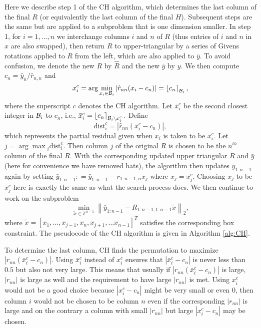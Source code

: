 \documentclass[conference]{IEEEtran}
\newcommand{\be}{\begin{equation}}
\newcommand{\ee}{\end{equation}}
\newcommand{\dist}{\mathrm{dist}}
\begin{document}
Here we describe  step 1 of the CH algorithm, which determines the last column of the final $R$ 
(or equivalently the last column of the final $H$).
Subsequent steps are the same but are applied to a subproblem that is one dimension smaller. 
In step 1, for $i = 1,\dots,n$ we interchange
columns $i$ and $n$ of  $R$ (thus entries of $i$ and $n$ in $x$ are also swapped), then return $R$ to upper-triangular
by a series of Givens rotations applied to $R$ from the left, which  are also applied to $\bar{y}$.
To avoid confusion, we denote the new $R$ by $\hat{R}$ and the new $\bar{y}$ by $\hat{y}$.
We then compute  $c_n=\hat{y}_n/\hat{r}_{n,n}$ and 
\be
x_i^c=\arg\min_{x_i\in {\cal B}_i}\left |\hat{r}_{nn}(x_i- c_n) \right | = \left \lfloor c_n \right \rceil_{{\cal B}_i},
\label{eq:xic}
\ee
where the superscript $c$ denotes the CH algorithm. 
Let $\bar{x}_i^c$ be the second closest integer in ${{\cal B}_i}$ to $c_n$,
i.e.,  
$\bar{x}_i^c= \left \lfloor c_n \right \rceil_{{\cal B}_i\backslash x_i^c}.$
Define
\be
\dist_i^c = |\hat{r}_{nn}( \bar{x}_i^c -c_n) |, 
\label{eq:dic}
\ee
which represents the partial residual given when $x_i$ is taken to be $\bar{x}_i^c$.
Let $j = {\arg\max}_i \dist_i^c$.
Then  column $j$ of the original $R$ is chosen to be the $n^{th}$ column of the final $R$.
With the corresponding updated upper triangular $R$ and $\bar{y}$
(here for convenience we have removed hats),
the algorithm then updates  $\bar{y}_{1:n-1}$ again
by setting $\bar{y}_{1:n-1}: = \bar{y}_{1:n-1} - r_{1:n-1,n}x_j$ where $x_j=x_j^c$. 
Choosing  $x_j$ to be  $x_j^c$ here is exactly the same as what the search process does.
We then continue to work on the subproblem 
\be
\min_{\tilde{x}\in \mathbb{Z}^{n-1}} \left \| \bar{y}_{1:n-1}-R_{1:n-1,1:n-1}\tilde{x} \right \|_2,
\label{eq:subc}
\ee
where $\tilde{x}=[x_1,\ldots, x_{j-1}, x_n, x_{j+1}, \ldots x_{n-1}]^T$ satisfies the corresponding box constraint.
The pseudocode of the CH algorithm is given in Algorithm \ref{alg:CH}.

To determine the last column, CH finds the permutation to 
maximize $\left |r_{nn}(\bar{x}_i^c-c_n) \right |$. Using $\bar{x}_i^c$ instead of $x_i^c$
ensures that $\left | \bar{x}_i^c-c_n \right |$ is never less than $0.5$ but
also not very large. This means that usually if $\left | r_{nn}(\bar{x}_i^c-c_n)
\right |$ is large, $\left | r_{nn} \right |$ is large as well and the
requirement to have large $|r_{nn}|$ %
is met.
Using $x_i^c$ would not be a good choice because $\left | x_i^c - c_n \right |$ might be 
very small or even $0$, then column $i$ would not be chosen to be column $n$
even if the corresponding $|r_{nn}|$ is large and on the contrary a column with small $|r_{nn}|$
but large $|x_i^c-c_n|$ may be chosen. 
\end{document}
